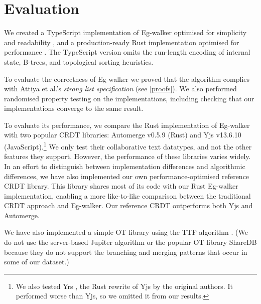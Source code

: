 \documentclass[sigplan,10pt]{acmart}
\newcommand{\algname}{Eg-walker\xspace}
\begin{document}
\section{Evaluation}\label{benchmarking}


We created a TypeScript implementation of \algname optimised for simplicity and readability \cite{reference-reg}, and a production-ready Rust implementation optimised for performance \cite{dt}.
The TypeScript version omits the run-length encoding of internal state, B-trees, and topological sorting heuristics.

To evaluate the correctness of \algname we proved that the algorithm complies with Attiya et al.'s \emph{strong list specification} \cite{Attiya2016} (see \autoref{proofs}).
We also performed randomised property testing on the implementations, including checking that our implementations converge to the same result.

To evaluate its performance, we compare the Rust implementation of \algname with two popular CRDT libraries: Automerge v0.5.9 \cite{automerge} (Rust) and Yjs v13.6.10 \cite{yjs} (JavaScript).\footnote{We also tested Yrs \cite{yrs}, the Rust rewrite of Yjs by the original authors. It performed worse than Yjs, so we omitted it from our results.}
We only test their collaborative text datatypes, and not the other features they support.
However, the performance of these libraries varies widely.
In an effort to distinguish between implementation differences and algorithmic differences, we have also implemented our own performance-optimised reference CRDT library.
This library shares most of its code with our Rust \algname implementation, enabling a more like-to-like comparison between the traditional CRDT approach and \algname.
Our reference CRDT outperforms both Yjs and Automerge.

We have also implemented a simple OT library using the TTF algorithm \cite{Oster2006TTF}.
(We do not use the server-based Jupiter algorithm \cite{Nichols1995} or the popular OT library ShareDB \cite{sharedb} because they do not support the branching and merging patterns that occur in some of our dataset.)
\end{document}

